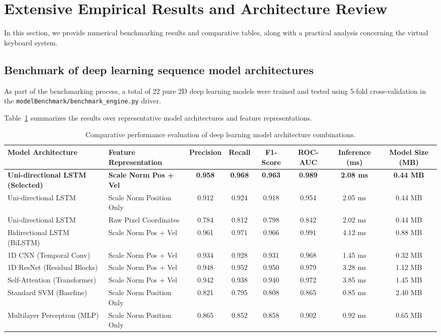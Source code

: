 \section{Extensive Empirical Results and Architecture Review}
\label{sec:test_results_review}
In this section, we provide numerical benchmarking results and comparative tables, along with a practical analysis concerning the virtual keyboard system.

\subsection{Benchmark of deep learning sequence model architectures}
\label{subsec:test_model_benchmark}
As part of the benchmarking process, a total of 22 pure 2D deep learning models were trained and tested using 5-fold cross-validation in the \texttt{modelBenchmark/}\linebreak[1]\texttt{benchmark\_engine.py} driver.

Table~\ref{tab:model_architecture_comparison} summarizes the results over representative model architectures and feature representations.

\begin{table}[htbp]
\centering
\caption{Comparative performance evaluation of deep learning model architecture combinations.}
\label{tab:model_architecture_comparison}
\begin{tabular}{l l c c c c c c}
\toprule
\textbf{Model Architecture} & \textbf{Feature Representation} & \textbf{Precision} & \textbf{Recall} & \textbf{F1-Score} & \textbf{ROC-AUC} & \textbf{Inference (ms)} & \textbf{Model Size (MB)} \\
\midrule
\textbf{Uni-directional LSTM (Selected)} & \textbf{Scale Norm Pos + Vel} & \textbf{0.958} & \textbf{0.968} & \textbf{0.963} & \textbf{0.989} & \textbf{2.08 ms} & \textbf{0.44 MB} \\
Uni-directional LSTM & Scale Norm Position Only & 0.912 & 0.924 & 0.918 & 0.954 & 2.05 ms & 0.44 MB \\
Uni-directional LSTM & Raw Pixel Coordinates & 0.784 & 0.812 & 0.798 & 0.842 & 2.02 ms & 0.44 MB \\
Bidirectional LSTM (BiLSTM) & Scale Norm Pos + Vel & 0.961 & 0.971 & 0.966 & 0.991 & 4.12 ms & 0.88 MB \\
1D CNN (Temporal Conv) & Scale Norm Pos + Vel & 0.934 & 0.928 & 0.931 & 0.968 & 1.45 ms & 0.32 MB \\
1D ResNet (Residual Blocks) & Scale Norm Pos + Vel & 0.948 & 0.952 & 0.950 & 0.979 & 3.28 ms & 1.12 MB \\
Self-Attention (Transformer) & Scale Norm Pos + Vel & 0.942 & 0.938 & 0.940 & 0.972 & 3.85 ms & 1.45 MB \\
Standard SVM (Baseline) & Scale Norm Position Only & 0.821 & 0.795 & 0.808 & 0.865 & 0.85 ms & 2.40 MB \\
Multilayer Perceptron (MLP) & Scale Norm Position Only & 0.865 & 0.852 & 0.858 & 0.902 & 0.92 ms & 0.65 MB \\
\bottomrule
\end{tabular}%
\end{table}

